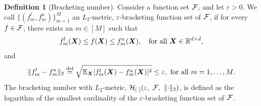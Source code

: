 \documentclass[11pt]{article}
\theoremstyle{plain}
\theoremstyle{definition}
\newtheorem{defn}{Definition}
\begin{document}
\begin{defn}[Bracketing number]\label{pro:inftynorm}
Consider a function set $\mathcal{F}$, and let $\varepsilon>0$. We call $\{(f^l_m,f^u_m)\}_{m=1}^M$ an $L_2$-metric, $\varepsilon$-bracketing function set of $\mathcal{F}$, if for every $f\in \mathcal{F}$, there exists an $m\in[M]$ such that 
\[
f^l_m(\bm X)\leq f(\bm X)\leq f^u_m(\bm X),\quad \text{for all }\bm X\in\mathbb{R}^{d\times d},
\]
and
\[
\lVert f^l_m-f^u_m\rVert_2\stackrel{\text{def}}{=}\sqrt{\mathbb{E}_{\bm X}|f^l_m(\bm X)-f^u_m(\bm X)|^2} \leq \varepsilon, \ \text{for all } m=1,\ldots,M. 
\]
The bracketing number with $L_2$-metric, $\tH_{[\ ]}(\varepsilon,\ \tF,\ \vnormSize{}{\cdot})$, is defined as the logarithm of the smallest cardinality of the $\varepsilon$-bracketing function set of $\mathcal{F}$.  
\end{defn}
\end{document}
